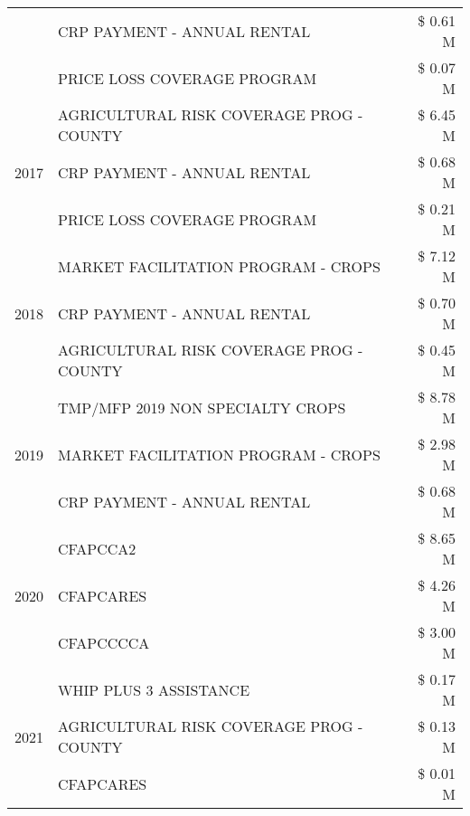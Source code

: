 \begin{tabular}{llr}
 & CRP PAYMENT - ANNUAL RENTAL & \$ 0.61 M \\
 & PRICE LOSS COVERAGE PROGRAM & \$ 0.07 M \\
\cline{1-3}
\multirow[t]{3}{*}{2017} & AGRICULTURAL RISK COVERAGE PROG - COUNTY & \$ 6.45 M \\
 & CRP PAYMENT - ANNUAL RENTAL & \$ 0.68 M \\
 & PRICE LOSS COVERAGE PROGRAM & \$ 0.21 M \\
\cline{1-3}
\multirow[t]{3}{*}{2018} & MARKET FACILITATION PROGRAM - CROPS & \$ 7.12 M \\
 & CRP PAYMENT - ANNUAL RENTAL & \$ 0.70 M \\
 & AGRICULTURAL RISK COVERAGE PROG - COUNTY & \$ 0.45 M \\
\cline{1-3}
\multirow[t]{3}{*}{2019} & TMP/MFP 2019 NON SPECIALTY CROPS & \$ 8.78 M \\
 & MARKET FACILITATION PROGRAM - CROPS & \$ 2.98 M \\
 & CRP PAYMENT - ANNUAL RENTAL & \$ 0.68 M \\
\cline{1-3}
\multirow[t]{3}{*}{2020} & CFAPCCA2 & \$ 8.65 M \\
 & CFAPCARES & \$ 4.26 M \\
 & CFAPCCCCA & \$ 3.00 M \\
\cline{1-3}
\multirow[t]{3}{*}{2021} & WHIP PLUS 3 ASSISTANCE & \$ 0.17 M \\
 & AGRICULTURAL RISK COVERAGE PROG - COUNTY & \$ 0.13 M \\
 & CFAPCARES & \$ 0.01 M \\
\cline{1-3}
\bottomrule
\end{tabular}
